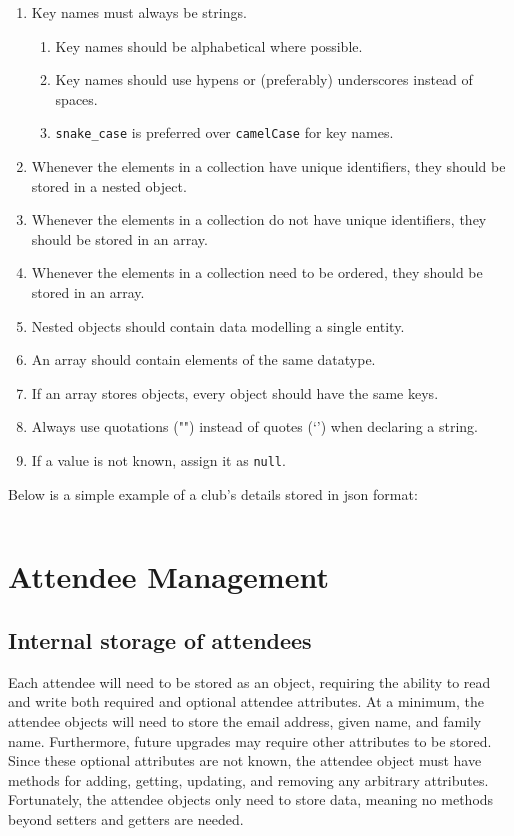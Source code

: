 \documentclass[11pt]{article}
\begin{document}
\begin{enumerate}
    \item Key names must always be strings.
    \begin{enumerate}
        \item Key names should be alphabetical where possible.
        \item Key names should use hypens or (preferably) underscores instead of spaces.
        \item \texttt{snake\_case} is preferred over \texttt{camelCase} for key names.
    \end{enumerate}
    \item Whenever the elements in a collection have unique identifiers, they should be stored in a nested \gls{object}.
    \item Whenever the elements in a collection do not have unique identifiers, they should be stored in an \gls{array}.
    \item Whenever the elements in a collection need to be ordered, they should be stored in an \gls{array}.
    \item Nested \glspl{object} should contain data modelling a single entity.
    \item An \gls{array} should contain elements of the same datatype.
    \item If an \gls{array} stores \glspl{object}, every \gls{object} should have the same keys.
    \item Always use quotations ("") instead of quotes (`') when declaring a string.
    \item If a value is not known, assign it as \texttt{null}.
\end{enumerate}

Below is a simple example of a club's details stored in \acrshort{json} format:

\inputminted[linenos=true]{json}{json_examples/club_details.json}

\newpage

\section{Attendee Management}

\subsection{Internal storage of attendees}

Each attendee will need to be stored as an \gls{object}, requiring the ability to read and write both required and optional attendee attributes. At a minimum, the attendee \glspl{object} will need to store the email address, given name, and family name. Furthermore, future upgrades may require other attributes to be stored. Since these optional attributes are not known, the attendee \gls{object} must have methods for adding, getting, updating, and removing any arbitrary attributes. Fortunately, the attendee \glspl{object} only need to store data, meaning no methods beyond setters and getters are needed.
\end{document}
